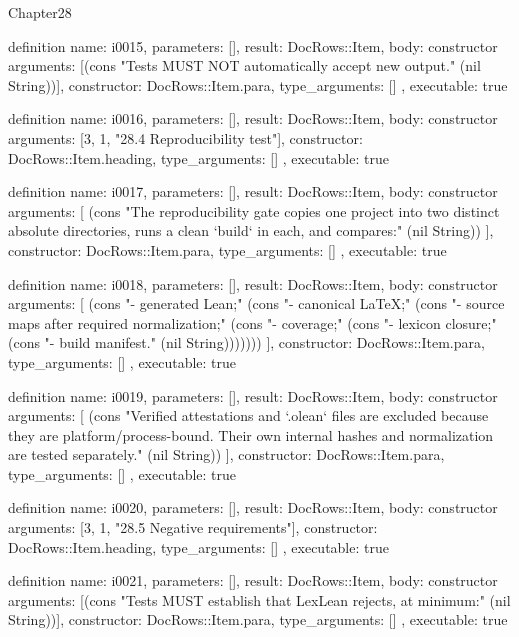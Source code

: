 \begin{lexlean}{Chapter28}
\begin{semanticmodule}
definition{
  name: i0015,
  parameters: [],
  result: DocRows::Item,
  body: constructor{
    arguments: [(cons "Tests MUST NOT automatically accept new output." (nil String))],
    constructor: DocRows::Item.para,
    type_arguments: []
  },
  executable: true
}

definition{
  name: i0016,
  parameters: [],
  result: DocRows::Item,
  body: constructor{
    arguments: [3, 1, "28.4 Reproducibility test"],
    constructor: DocRows::Item.heading,
    type_arguments: []
  },
  executable: true
}

definition{
  name: i0017,
  parameters: [],
  result: DocRows::Item,
  body: constructor{
    arguments: [
      (cons "The reproducibility gate copies one project into two distinct absolute directories, runs a clean `build` in each, and compares:" (nil String))
    ],
    constructor: DocRows::Item.para,
    type_arguments: []
  },
  executable: true
}

definition{
  name: i0018,
  parameters: [],
  result: DocRows::Item,
  body: constructor{
    arguments: [
      (cons "- generated Lean;" (cons "- canonical LaTeX;" (cons "- source maps after required normalization;" (cons "- coverage;" (cons "- lexicon closure;" (cons "- build manifest." (nil String)))))))
    ],
    constructor: DocRows::Item.para,
    type_arguments: []
  },
  executable: true
}

definition{
  name: i0019,
  parameters: [],
  result: DocRows::Item,
  body: constructor{
    arguments: [
      (cons "Verified attestations and `.olean` files are excluded because they are platform/process-bound. Their own internal hashes and normalization are tested separately." (nil String))
    ],
    constructor: DocRows::Item.para,
    type_arguments: []
  },
  executable: true
}

definition{
  name: i0020,
  parameters: [],
  result: DocRows::Item,
  body: constructor{
    arguments: [3, 1, "28.5 Negative requirements"],
    constructor: DocRows::Item.heading,
    type_arguments: []
  },
  executable: true
}

definition{
  name: i0021,
  parameters: [],
  result: DocRows::Item,
  body: constructor{
    arguments: [(cons "Tests MUST establish that LexLean rejects, at minimum:" (nil String))],
    constructor: DocRows::Item.para,
    type_arguments: []
  },
  executable: true
}


\end{semanticmodule}
\end{lexlean}
